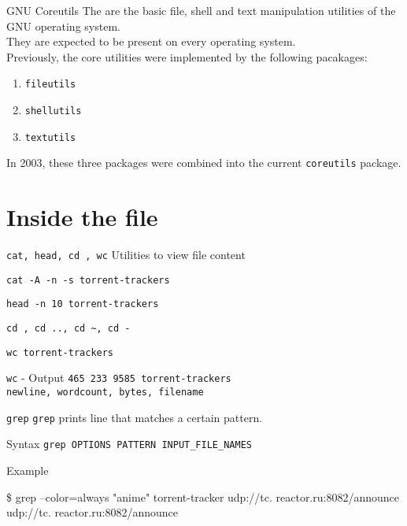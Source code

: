 \documentclass[11pt]{beamer}
\begin{document}
		\begin{frame}{GNU Coreutils}
			The {\textbf{\color{darkpurple}{GNU Core Utilities} } } are the basic file, shell and text manipulation utilities of the GNU operating system. \\
				They are expected to be present on every operating system. \\
				Previously, the core utilities were implemented by the following pacakages:
				\begin{enumerate}
				  \item \texttt{fileutils} 
				  \item \texttt{shellutils} 
				  \item \texttt{textutils}
				\end{enumerate}	
				In 2003, these three packages were combined into the current \texttt{coreutils} package.
		\end{frame}

	\section[File]{Inside the file}
			\begin{frame}{\texttt{cat, head, cd , wc}}
				Utilities to view file content
				\begin{example}
					\texttt{cat -A -n -s torrent-trackers}
				\end{example}
				\begin{example}
					\texttt{head -n 10 torrent-trackers}
				\end{example}
				\begin{example}
					\texttt{cd , cd .., cd \textasciitilde, cd -}
				\end{example}
				\begin{example}
					\texttt{wc torrent-trackers}
				\end{example}
				{
					\begin{alertblock}{\texttt{wc} - Output}
						\texttt{465  233 9585 torrent-trackers} \\
						\tiny \texttt{newline, wordcount, bytes, filename}
					\end{alertblock}
				}
			\end{frame}


			\begin{frame}{\texttt{grep}}
				\texttt{grep} prints line that matches a certain pattern.
				\begin{alertblock}{Syntax}
					\texttt{grep OPTIONS PATTERN INPUT\_FILE\_NAMES}
				\end{alertblock}
				\begin{exampleblock}{Example}
					\begin{semiverbatim}
						\$ grep --color=always "anime" torrent-tracker
						udp://tc.{\textbf{\color{red}{anime} } }reactor.ru:8082/announce
						udp://tc.{\textbf{\color{red}{anime} } }reactor.ru:8082/announce 
					\end{semiverbatim}	
				\end{exampleblock}
			\end{frame}
\end{document}
